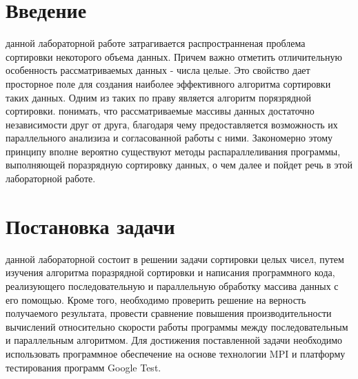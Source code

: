 \documentclass[12pt]{report}
\begin{document}
\setcounter{page}{2}

\tableofcontents

\newpage

\section*{Введение}
 данной лабораторной работе затрагивается распространненая проблема сортировки некоторого объема данных. Причем важно отметить отличительную особенность рассматриваемых данных - числа целые. Это свойство дает просторное поле для создания наиболее эффективного алгоритма сортировки таких данных. Одним из таких по праву является алгоритм порязрядной сортировки.
 понимать, что рассматриваемые массивы данных достаточно независимости друг от друга, благодаря чему предоставляется возможность их параллельного анализиза и согласованной работы с ними. Закономерно этому принципу вполне вероятно существуют методы распараллеливания программы, выполняющей поразрядную сортировку данных, о чем далее и пойдет речь в этой лабораторной работе.

\newpage


\section*{Постановка задачи}
 данной лабораторной состоит в решении задачи сортировки целых чисел, путем изучения алгоритма поразрядной сортировки и написания программного кода, реализующего последовательную и параллельную обработку массива данных с его помощью. Кроме того, необходимо проверить решение на верность получаемого результата, провести сравнение повышения производительности вычислений относительно скорости работы программы между последовательным и параллельным алгоритмом. Для достижения поставленной задачи необходимо использовать программное обеспечение на основе технологии MPI и платформу тестирования программ Google Test.

\newpage
\end{document}
